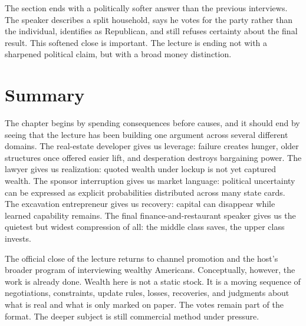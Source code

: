 The section ends with a politically softer answer than the previous interviews. The speaker describes a split household, says he votes for the party rather than the individual, identifies as Republican, and still refuses certainty about the final result. This softened close is important. The lecture is ending not with a sharpened political claim, but with a broad money distinction.

\section{Summary}

The chapter begins by spending consequences before causes, and it should end by seeing that the lecture has been building one argument across several different domains. The real-estate developer gives us leverage: failure creates hunger, older structures once offered easier lift, and desperation destroys bargaining power. The lawyer gives us realization: quoted wealth under lockup is not yet captured wealth. The sponsor interruption gives us market language: political uncertainty can be expressed as explicit probabilities distributed across many state cards. The excavation entrepreneur gives us recovery: capital can disappear while learned capability remains. The final finance-and-restaurant speaker gives us the quietest but widest compression of all: the middle class saves, the upper class invests.

The official close of the lecture returns to channel promotion and the host's broader program of interviewing wealthy Americans. Conceptually, however, the work is already done. Wealth here is not a static stock. It is a moving sequence of negotiations, constraints, update rules, losses, recoveries, and judgments about what is real and what is only marked on paper. The votes remain part of the format. The deeper subject is still commercial method under pressure.